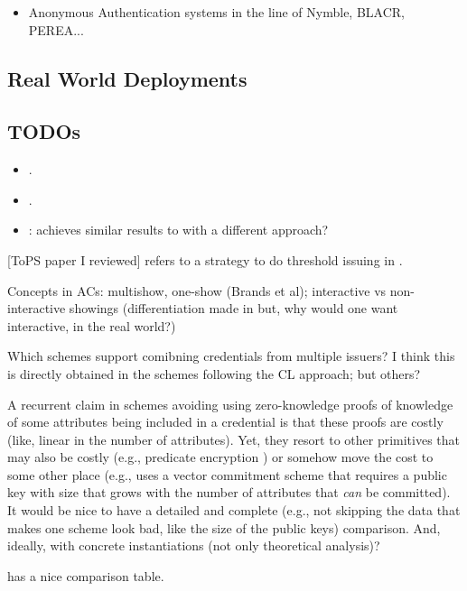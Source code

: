 \begin{itemize}
\item Anonymous Authentication systems in the line of Nymble, BLACR, PEREA...
\end{itemize}

\subsection{Real World Deployments}
\label{ssec:acrealworld}

\subsection{TODOs}

\begin{itemize}
\item \cite{bckl08}.
\item \cite{sand20}.
\item \cite{kkl+16}: achieves similar results to \cite{cgm16} with a different approach?
\end{itemize}

[ToPS paper I reviewed] refers to a strategy to do threshold issuing in \cite{bbh06}.

Concepts in ACs: multishow, one-show (Brands et al); interactive vs non-interactive
showings (differentiation made in \cite[p.6]{fhs19} but, why would one want interactive,
in the real world?)

Which schemes support comibning credentials from multiple issuers? I think this
is directly obtained in the schemes following the CL approach; but others?

A recurrent claim in schemes avoiding using zero-knowledge proofs of knowledge
of some attributes being included in a credential is that these proofs are costly
(like, linear in the number of attributes). Yet, they resort to other primitives
that may also be costly (e.g., predicate encryption \cite{dmm+18}) or somehow move
the cost to some other place (e.g., \cite{fhs19} uses a vector commitment scheme
that requires a public key with size that grows with the number of attributes
that \emph{can} be committed). It would be nice to have a detailed and complete
(e.g., not skipping the data that makes one scheme look bad, like the size of
the public keys) comparison. And, ideally, with concrete instantiations (not only
theoretical analysis)?

\cite{fhs19} has a nice comparison table.

